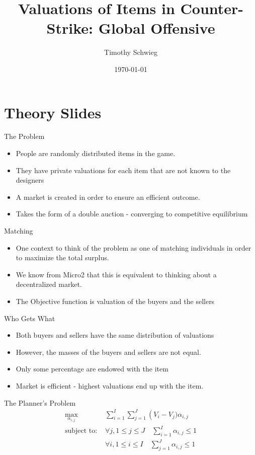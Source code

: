 \documentclass[bigger]{beamer}
\author{Timothy Schwieg}
\date{\today}
\title{Valuations of Items in Counter-Strike: Global Offensive}
\begin{document}
\maketitle

\section{Theory Slides}
\label{sec-1}

\begin{frame}[label=sec-1-1]{The Problem}
\begin{itemize}
\item People are randomly distributed items in the game.
\item They have private valuations for each item that are not known to the
designers
\item A market is created in order to ensure an efficient outcome.
\item Takes the form of a double auction - converging to competitive equilibrium
\end{itemize}
\end{frame}

\begin{frame}[label=sec-1-2]{Matching}
\begin{itemize}
\item One context to think of the problem as one of matching individuals
in order to maximize the total surplus.
\item We know from Micro2 that this is equivalent to thinking about a
decentralized market.
\item The Objective function is valuation of the buyers and the sellers
\end{itemize}
\end{frame}

\begin{frame}[label=sec-1-3]{Who Gets What}
\begin{itemize}
\item Both buyers and sellers have the same distribution of valuations
\item However, the masses of the buyers and sellers are not equal.
\item Only some percentage are endowed with the item
\item Market is efficient - highest valuations end up with the item.
\end{itemize}
\end{frame}

\begin{frame}[label=sec-1-4]{The Planner's Problem}
\begin{align*}
\max_{\alpha_{i,j}} & \sum_{i=1}^I \sum_{j=1}^J \left ( V_i - V_j ) \alpha_{i,j} \\
\text{subject to: } & \forall j, 1 \leq j \leq J \quad \sum_{i=1}^I \alpha_{i,j} \leq 1 \\
& \forall i, 1 \leq i \leq I \quad \sum_{j=1}^J \alpha_{i,j} \leq 1\\
\end{align*}
\end{frame}
\end{document}
